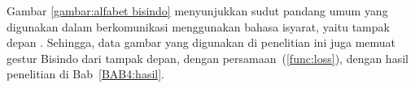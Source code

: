 \lipsum[7]
Gambar \ref{gambar:alfabet bisindo} menyunjukkan sudut pandang umum yang digunakan dalam berkomunikasi menggunakan bahasa isyarat, yaitu tampak depan \citep{xiong2004_dscForSensorNetworks}. Sehingga, data gambar yang digunakan di penelitian ini juga memuat gestur Bisindo dari tampak depan, dengan persamaan~(\ref{func:loss}), dengan hasil penelitian di Bab~\ref{BAB4:hasil}.